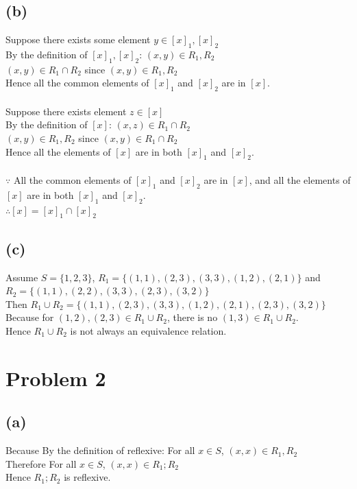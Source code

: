 \documentclass{article} %
\begin{document}
\subsection*{(b)}
Suppose there exists some element $y \in [x]_1, [x]_2$\\
By the definition of $[x]_1, [x]_2$: $(x, y) \in R_1, R_2$\\
$(x, y) \in R_1 \cap R_2$ since $(x, y) \in R_1, R_2$\\
Hence all the common elements of $[x]_1$ and $[x]_2$ are in $[x]$.\\
\\
Suppose there exists element $z \in [x]$\\
By the definition of $[x]$: $(x, z) \in R_1 \cap R_2$\\
$(x, y) \in R_1, R_2$ since $(x, y) \in R_1 \cap R_2$\\
Hence all the elements of $[x]$ are in both $[x]_1$ and $[x]_2$.\\
\\
$\because$ All the common elements of $[x]_1$ and $[x]_2$ are in $[x]$, and all the elements of $[x]$ are in both $[x]_1$ and $[x]_2$.\\
$\therefore [x] = [x]_1 \cap [x]_2$\\
\subsection*{(c)}
Assume $S = \{1, 2, 3\}$, $R_1 = \{(1, 1), (2, 3), (3, 3), (1, 2), (2, 1)\}$ and $R_2 = \{(1, 1), (2, 2), (3, 3), (2, 3), (3, 2)\}$\\
Then $R_1 \cup R_2 =\{(1, 1), (2, 3), (3, 3), (1, 2), (2, 1), (2, 3), (3, 2)\}$\\
Because for $(1, 2), (2, 3)\in R_1 \cup R_2$, there is no $ (1, 3) \in R_1 \cup R_2$.\\
Hence $R_1 \cup R_2$ is not always an equivalence relation.\\

\section*{Problem 2}
\subsection*{(a)}
Because By the definition of reflexive: For all $x \in S$, $(x, x)\in R_1, R_2$\\
Therefore For all $x \in S$, $ (x, x) \in R_1;R_2$\\
Hence $R_1;R_2$ is reflexive.\\
\end{document}
